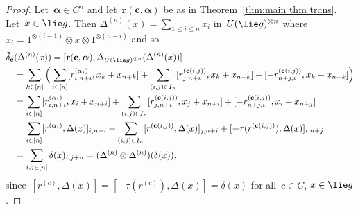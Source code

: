 \documentclass[12pt, reqno]{amsart}
\theoremstyle{definition}
\numberwithin{equation}{section}
\newcommand{\tensor}{\otimes}
\begin{document}
\begin{proof}
Let~$\boldsymbol{\alpha}\in C^n$ and let~$\mathbf r(\mathbf c,\boldsymbol\alpha)$
be as in Theorem~\ref{thm:main thm trans}. 
Let~$x\in \lie g$. Then $\Delta^{(n)}(x)=\sum_{1\le i\le n} x_i$ in~$U(\lie g)^{\tensor n}$
where~$x_i=1^{\tensor (i-1)}\tensor x\tensor 1^{\tensor (n-i)}$ and so
\begin{align*}
\tilde\delta_{\mathbf c}&(\Delta^{(n)}(x))=[\mathbf r(\mathbf c,\boldsymbol{\alpha}),\Delta_{U(\lie g)^{\tensor n}}(\Delta^{(n)}(x))]\\
&=
\sum_{k\in[n]} \Big(\sum_{i\in[n]} [r_{i,n+i}^{(\alpha_i)},x_k+x_{n+k}]
+\sum_{(i,j)\in I_n} [r_{j,n+i}^{(\mathbf c(i,j))},x_k+x_{n+k}]+
[-r_{n+j,i}^{(\mathbf c(i,j))},x_k+x_{n+k}]\Big)
\\
&=
\sum_{i\in[n]} [r_{i,n+i}^{(\alpha_i)},x_i+x_{n+i}]
+\sum_{(i,j)\in I_n} [r_{j,n+i}^{(\mathbf c(i,j))},x_j+x_{n+i}]+
[-r_{n+j,i}^{(\mathbf c(i,j))},x_i+x_{n+j}]\\
&=
\sum_{i\in[n]} [r^{(\alpha_i)},\Delta(x)]_{i,n+i}
+\sum_{(i,j)\in I_n} [r^{(\mathbf c(i,j))},\Delta(x)]_{j,n+i}+
[-\tau(r^{(\mathbf c(i,j))}),\Delta(x)]_{i,n+j}\\
&=\sum_{i,j\in[n]}\delta(x)_{i,j+n}
=(\Delta^{(n)}\tensor \Delta^{(n)})(\delta(x)),
\end{align*}
since~$[r^{(c)},\Delta(x)]=[-\tau(r^{(c)}),\Delta(x)]=\delta(x)$ for all~$c\in C$, 
$x\in\lie g$.
\end{proof}
\end{document}
